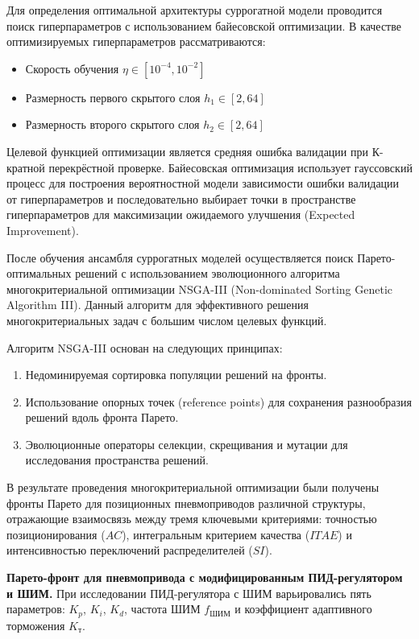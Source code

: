 Для определения оптимальной архитектуры суррогатной модели проводится поиск гиперпараметров
с использованием байесовской оптимизации. В качестве оптимизируемых гиперпараметров рассматриваются:

\begin{itemize}
	\item Скорость обучения $\eta \in [10^{-4}, 10^{-2}]$
	\item Размерность первого скрытого слоя $h_1 \in [2, 64]$
	\item Размерность второго скрытого слоя $h_2 \in [2, 64]$
\end{itemize}

Целевой функцией оптимизации является средняя ошибка валидации при К-кратной перекрёстной
проверке. Байесовская оптимизация использует гауссовский процесс для построения вероятностной
модели зависимости ошибки валидации от гиперпараметров и последовательно выбирает точки в
пространстве гиперпараметров для максимизации ожидаемого улучшения (Expected Improvement).

После обучения ансамбля суррогатных моделей осуществляется поиск
Парето-оптимальных решений с использованием эволюционного алгоритма
многокритериальной оптимизации NSGA-III (Non-dominated Sorting Genetic Algorithm III).
Данный алгоритм для эффективного решения многокритериальных задач с большим числом
целевых функций.

Алгоритм NSGA-III основан на следующих принципах:
\begin{enumerate}
	\item Недоминируемая сортировка популяции решений на фронты.
	\item Использование опорных точек (reference points) для сохранения разнообразия решений вдоль фронта Парето.
	\item Эволюционные операторы селекции, скрещивания и мутации для исследования пространства решений.
\end{enumerate}

В результате проведения многокритериальной оптимизации были получены фронты Парето для 
позиционных пневмоприводов различной структуры, отражающие взаимосвязь между тремя
ключевыми критериями: точностью позиционирования ($AC$), интегральным критерием качества
($ITAE$) и интенсивностью переключений распределителей ($SI$).

\textbf{Парето-фронт для пневмопривода с модифицированным ПИД-регулятором и ШИМ.}
При исследовании ПИД-регулятора с ШИМ варьировались пять параметров: $K_p$, $K_i$, $K_d$,
частота ШИМ $f_{\text{ШИМ}}$ и коэффициент адаптивного торможения $K_{\text{т}}$.

